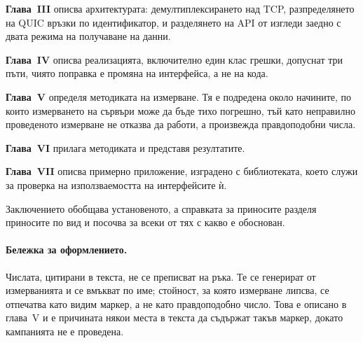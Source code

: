 \textbf{Глава~III} описва архитектурата: демултиплексирането над TCP, разпределянето на QUIC
връзки по идентификатор, и разделянето на API от изгледи заедно с двата режима на получаване
на данни.

\textbf{Глава~IV} описва реализацията, включително един клас грешки, допуснат три пъти, чиято
поправка е промяна на интерфейса, а не на кода.

\textbf{Глава~V} определя методиката на измерване. Тя е подредена около начините, по които
измерването на сървъри може да бъде тихо погрешно, тъй като неправилно проведеното измерване
не отказва да работи, а произвежда правдоподобни числа.

\textbf{Глава~VI} прилага методиката и представя резултатите.

\textbf{Глава~VII} описва примерно приложение, изградено с библиотеката, което служи за
проверка на използваемостта на интерфейсите ѝ.

Заключението обобщава установеното, а справката за приносите разделя приносите по вид и
посочва за всеки от тях с какво е обоснован.

\paragraph{Бележка за оформлението.} Числата, цитирани в текста, не се преписват на ръка.
Те се генерират от измерванията и се вмъкват по име; стойност, за която измерване липсва, се
отпечатва като видим маркер, а не като правдоподобно число. Това е описано в глава~V и е
причината някои места в текста да съдържат такъв маркер, докато кампанията не е проведена.
